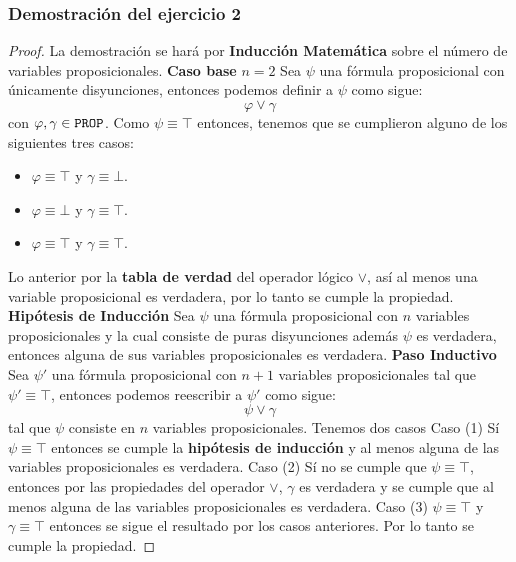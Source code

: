 \documentclass[a4paper]{article}
\begin{document}
\subsubsection{Demostración del ejercicio 2}
\begin{proof}
    La demostración se hará por \textbf{Inducción Matemática} sobre el número de variables proposicionales.
    \newline
    \textbf{Caso base}
    \newline
    \(n = 2\)
    \newline 
    Sea \(\psi\) una fórmula proposicional con únicamente disyunciones, entonces podemos definir 
    a \(\psi\) como sigue:
    \[
        \varphi \lor \gamma
    \]
    con \(\varphi, \gamma \in \text{\texttt{PROP}}\).
    \newline 
    Como \(\psi \equiv \top\) entonces, tenemos que se cumplieron alguno de los siguientes tres
    casos:
    \begin{itemize}
        \item \(\varphi \equiv \top\) y \(\gamma \equiv \bot\).
        \item \(\varphi \equiv \bot\) y \(\gamma \equiv \top\).
        \item \(\varphi \equiv \top\) y \(\gamma \equiv \top\).
    \end{itemize}
    Lo anterior por la \textbf{tabla de verdad} del operador lógico \(\lor\), así al menos una variable 
    proposicional es verdadera, por lo tanto se cumple la propiedad.
    \newline 
    \textbf{Hipótesis de Inducción}
    \newline 
    Sea \(\psi\) una fórmula proposicional con \(n\) variables proposicionales y la cual consiste
    de puras disyunciones además \(\psi\) es verdadera, entonces alguna de sus variables proposicionales es
    verdadera.
    \newline 
    \textbf{Paso Inductivo}
    \newline
    Sea \(\psi'\) una fórmula proposicional con \(n + 1\) variables proposicionales tal que 
    \(\psi' \equiv \top\), entonces podemos reescribir a \(\psi'\) como sigue:
    \[
        \psi \lor \gamma  
    \]
    tal que \(\psi\) consiste en \(n\) variables proposicionales.
    \newline 
    Tenemos dos casos
    \newline 
    Caso (1)
    \newline 
    Sí \(\psi \equiv \top\) entonces se cumple la \textbf{hipótesis de inducción} y 
    al menos alguna de las variables proposicionales es verdadera.
    \newline 
    Caso (2)
    \newline 
    Sí no se cumple que \(\psi \equiv \top\), entonces por las propiedades del operador \(\lor\),
    \(\gamma\) es verdadera y se cumple que al menos alguna de las variables proposicionales
    es verdadera. 
    \newline 
    Caso (3)
    \newline 
    \(\psi \equiv \top\) y \(\gamma \equiv \top\) entonces se sigue el resultado por los casos 
    anteriores.
    \newline 
    Por lo tanto se cumple la propiedad.
\end{proof}
\end{document}
